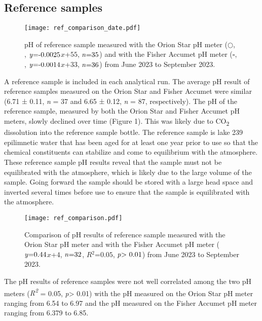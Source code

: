 \documentclass[
]{article}
\DeclareRobustCommand{\solidline}{\raisebox{2pt}{\tikz{\draw[thick](0,0) -- (0.5,0);}}}
\DeclareRobustCommand{\dashedline}{\raisebox{2pt}{\tikz{\draw[dashed, thick](0,0) -- (0.5,0);}}}
\begin{document}
\hypertarget{reference-samples}{%
\subsection{Reference samples}\label{reference-samples}}

\begin{wrapfigure}{r}{0.5\textwidth}
  \texttt{[image: ref\_comparison\_date.pdf]}
  \caption{pH of reference sample measured with the Orion Star pH meter ($\bigcirc$, \protect\solidline, $\mbox{\textit{y}=-0.0025}$$\textit{x}$+$\mbox{55}$, $\mbox{\textit{n}=35}$) and with the Fisher Accumet pH meter ($\square$, \protect\dashedline, $\mbox{\textit{y}=-0.0014}$$\textit{x}$+$\mbox{33}$, $\mbox{\textit{n}=36}$) from June 2023 to September 2023.}
\end{wrapfigure}

A reference sample is included in each analytical run. The average pH
result of reference samples measured on the Orion Star and Fisher
Accumet were similar (6.71 ± 0.11, \emph{n} = 37 and 6.65 ± 0.12,
\emph{n} = 87, respectively). The pH of the reference sample, measured
by both the Orion Star and Fisher Accumet pH meters, slowly declined
over time (Figure 1). This was likely due to CO\textsubscript{2}
dissolution into the reference sample bottle. The reference sample is
lake 239 epilimnetic water that has been aged for at least one year
prior to use so that the chemical constituents can stabilize and come to
equilibrium with the atmosphere. These reference sample pH results
reveal that the sample must not be equilibrated with the atmosphere,
which is likely due to the large volume of the sample. Going forward the
sample should be stored with a large head space and inverted several
times before use to ensure that the sample is equilibrated with the
atmosphere.

\begin{wrapfigure}{r}{0.5\textwidth}
  \baselineskip 
  \texttt{[image: ref\_comparison.pdf]}
  \caption{Comparison of pH results of reference sample measured with the Orion Star pH meter and with the Fisher Accumet pH meter ($\mbox{\textit{y}=0.44}$$\textit{x}$+$\mbox{4}$, $\mbox{\textit{n}=32}$, $\textit{R}$$^2$$\mbox{=0.05}$, $\mbox{\textit{p}> 0.01}$) from June 2023 to September 2023.}
\end{wrapfigure}

The pH results of reference samples were not well correlated among the
two pH meters (\emph{R\textsuperscript{2}} = 0.05,
\emph{p}\textgreater{} 0.01) with the pH measured on the Orion Star pH
meter ranging from 6.54 to 6.97 and the pH measured on the Fisher
Accumet pH meter ranging from 6.379 to 6.85.
\end{document}
